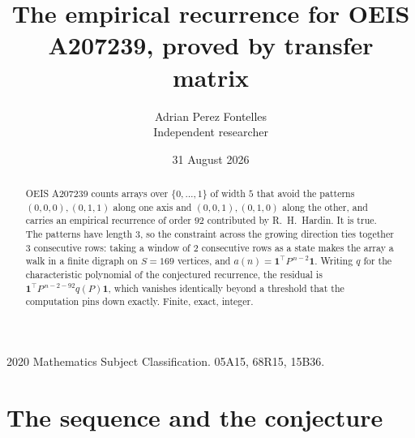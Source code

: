 \documentclass[11pt,a4paper]{article}
\title{The empirical recurrence for OEIS A207239, proved by transfer matrix}
\author{Adrian Perez Fontelles\\ \small Independent researcher}
\date{31 August 2026}
\theoremstyle{plain}
\theoremstyle{definition}
\begin{document}
\maketitle

\begin{abstract}
OEIS A207239 counts arrays over $\{0,\dots,1\}$ of width $5$ that avoid the patterns
$(0,0,0), (0,1,1)$ along one axis and $(0,0,1), (0,1,0)$ along the other, and carries an empirical recurrence of
order $92$ contributed by R.~H.~Hardin. It is true. The patterns have length $3$, so
the constraint across the growing direction ties together $3$ consecutive rows: taking a
window of $2$ consecutive rows as a state makes the array a walk in a finite digraph
on $S=169$ vertices, and $a(n)=\mathbf{1}^{\!\top}P^{\,n-2}\mathbf{1}$. Writing $q$
for the characteristic polynomial of the conjectured recurrence, the residual is
$\mathbf{1}^{\!\top}P^{\,n-2-92}q(P)\mathbf{1}$, which vanishes identically
beyond a threshold that the computation pins down exactly. Finite, exact, integer.
\end{abstract}

\noindent\small 2020 Mathematics Subject Classification. 05A15, 68R15, 15B36.\normalsize

\section{The sequence and the conjecture}
\end{document}
